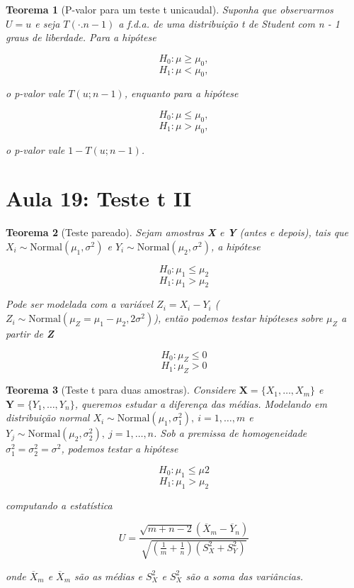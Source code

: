 \documentclass{article}
\newtheorem{theorem}{Teorema}
\begin{document}
\begin{theorem}[P-valor para um teste t unicaudal]
Suponha que observarmos $U = u$ e seja $T(\cdot. n - 1)$ a f.d.a. de uma distribuição t de Student com n - 1 graus de liberdade. Para a hipótese

$$H_0 : \mu \geq \mu_0,$$
$$H_1 : \mu < \mu_0,$$

o p-valor vale $T(u; n-1)$, enquanto para a hipótese

$$H_0 : \mu \leq \mu_0,$$
$$H_1 : \mu > \mu_0,$$

o p-valor vale $1 - T(u; n-1)$.
\end{theorem}

\section*{Aula 19: Teste t II}\label{s19}
\begin{theorem}[Teste pareado]
Sejam amostras \textbf{X} e \textbf{Y} (antes e depois), tais que $X_i \sim \mathrm{Normal}(\mu_1, \sigma^2)$ e $Y_i \sim \mathrm{Normal}(\mu_2, \sigma^2)$, a hipótese

$$H_0 : \mu_1 \leq \mu_2$$
$$H_1 : \mu_1 > \mu_2$$

Pode ser modelada com a variável $Z_i = X_i - Y_i$ ($Z_i \sim \mathrm{Normal}(\mu_Z = \mu_1 - \mu_2, 2 \sigma^2)$), então podemos testar hipóteses sobre $\mu_Z$ a partir de \textbf{Z}

$$H_0 : \mu_Z \leq 0$$
$$H_1 : \mu_Z > 0$$
\end{theorem}

\begin{theorem}[Teste t para duas amostras]
Considere $\textbf{X} = \{ X_1, \ldots, X_m \}$ e $\textbf{Y} = \{ Y_1, \ldots, Y_n \}$, queremos estudar a diferença das médias. Modelando em distribuição normal $X_i \sim \mathrm{Normal}(\mu_1, \sigma_1^2), \ i = 1, \ldots, m$ e $Y_j \sim \mathrm{Normal}(\mu_2, \sigma_2^2), \ j = 1, \ldots, n$. Sob a premissa de homogeneidade $\sigma_1^2 = \sigma_2^2 = \sigma^2$, podemos testar a hipótese

$$H_0 : \mu_1 \leq \mu2$$
$$H_1 : \mu_1 > \mu_2$$

computando a estatística

$$U = \frac{\sqrt{m + n - 2} (\overline{X}_m - \overline{Y}_n)}{\sqrt{(\frac{1}{m} + \frac{1}{n})(S_X^2 + S_Y^2)}}$$

onde $\overline{X}_m$ e $\overline{X}_m$ são as médias e $S_X^2$ e $S_X^2$ são a soma das variâncias.
\end{theorem}
\end{document}
